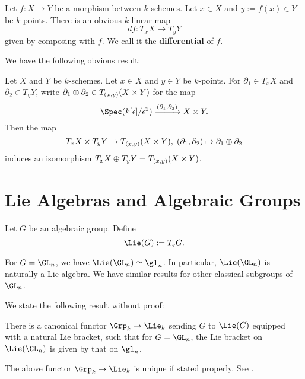 \begin{constr}
	Let $f:X\to Y$ be a morphism between $k$-schemes. Let $x\in X$ and $y:=f(x)\in Y$ be $k$-points. There is an obvious $k$-linear map
	\[
		df: T_x X \to T_y Y
	\]
	given by composing with $f$. We call it the \textbf{differential} of $f$.
\end{constr}

	We have the following obvious result:

\begin{lem}
	\label{lem-tangent-product}
 	Let $X$ and $Y$ be $k$-schemes. Let $x\in X$ and $y\in Y$ be $k$-points. For $\partial_1\in T_x X$ and $\partial_2\in T_yY$, write $\partial_1\oplus\partial_2\in T_{(x,y)}(X\mt Y)$ for the map
 	\[
 		\Spec(k[\epsilon]/\epsilon^2) \xrightarrow{(\partial_1,\partial_2)} X\mt  Y.
 	\]
 	Then the map
 	\begin{equation}
 		\label{eqn-sum-tangent}
 		T_x X \times T_y Y \to T_{(x,y)}(X\mt Y),\; (\partial_1,\partial_2) \mapsto \partial_1\oplus\partial_2
 	\end{equation}
 	induces an isomorphism $T_x X\oplus T_y Y = T_{(x,y)}(X\mt Y)$.

\end{lem}


\section{Lie Algebras and Algebraic Groups}

\begin{notn}
	Let $G$ be an algebraic group. Define
	\[
		\Lie(G):= T_e G.
	\]
\end{notn}

\begin{exam}
	For $G=\GL_n$, we have $\Lie(\GL_n) \simeq \gl_n$. In particular, $\Lie(\GL_n)$ is naturally a Lie algebra. We have similar results for other classical subgroups of $\GL_n$.
\end{exam}

We state the following result without proof:

\begin{thm}	
	There is a canonical functor $\Grp_k \to \Lie_k$ sending $G$ to $\Lie(G)$ equipped with a natural Lie bracket, such that for $G=\GL_n$, the Lie bracket on $\Lie(\GL_n)$ is given by that on $\gl_n$.
\end{thm}

\begin{rem}
	The above functor $\Grp_k \to \Lie_k$ is unique if stated properly. See \cite[Theorem 10.23]{M}.
\end{rem}

